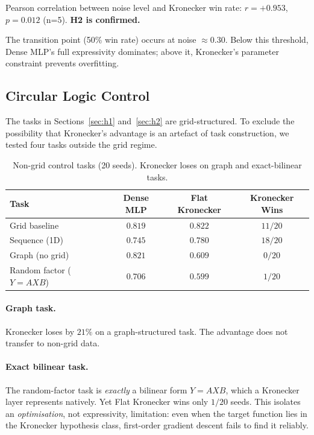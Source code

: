 \documentclass[11pt,a4paper]{article}
\begin{document}
Pearson correlation between noise level and Kronecker win rate:
$r = +0.953$, $p = 0.012$ (n=5). \textbf{H2 is confirmed.}

The transition point (50\% win rate) occurs at noise
$\approx 0.30$. Below this threshold, Dense MLP's full
expressivity dominates; above it, Kronecker's parameter
constraint prevents overfitting.


\subsection{Circular Logic Control}
\label{sec:non-grid}

The tasks in Sections~\ref{sec:h1} and~\ref{sec:h2} are
grid-structured. To exclude the possibility that Kronecker's
advantage is an artefact of task construction, we tested four
tasks outside the grid regime.

\begin{table}[h]
\centering
\caption{Non-grid control tasks (20 seeds). Kronecker loses on
graph and exact-bilinear tasks.}
\label{tab:non-grid}
\small
\begin{tabular}{lccc}
\toprule
Task & Dense MLP & Flat Kronecker & Kronecker Wins \\
\midrule
Grid baseline             & $0.819$ & $0.822$ & $11/20$ \\
Sequence (1D)             & $0.745$ & $\mathbf{0.780}$ & $18/20$ \\
Graph (no grid)           & $\mathbf{0.821}$ & $0.609$ & $0/20$ \\
Random factor ($Y=AXB$)   & $\mathbf{0.706}$ & $0.599$ & $1/20$ \\
\bottomrule
\end{tabular}
\end{table}

\paragraph{Graph task.}
Kronecker loses by $21\%$ on a graph-structured task. The
advantage does not transfer to non-grid data.

\paragraph{Exact bilinear task.}
The random-factor task is \emph{exactly} a bilinear form
$Y = AXB$, which a Kronecker layer represents natively. Yet
Flat Kronecker wins only $1/20$ seeds. This isolates an
\emph{optimisation}, not expressivity, limitation: even when
the target function lies in the Kronecker hypothesis class,
first-order gradient descent fails to find it reliably.
\end{document}
